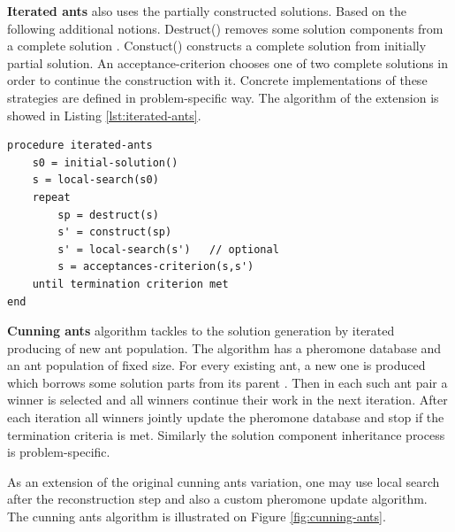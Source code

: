 \documentclass[12pt,a4paper,oneside]{book}
\begin{document}
\textbf{Iterated ants} also uses the partially constructed solutions. Based on the following additional notions. Destruct() removes some solution components from a complete solution \cite{10.1007/11839088_16}. Constuct() constructs a complete solution from initially partial solution. An acceptance-criterion chooses one of two complete solutions in order to continue the construction with it. Concrete implementations of these strategies are defined in problem-specific way. The algorithm of the extension is showed in Listing \ref{lst:iterated-ants}.

\begin{minipage}[c, breaklines=true]{0.95\textwidth}
\begin{lstlisting}[caption={General iterated ants pseudo-code}, label={lst:iterated-ants}]
procedure iterated-ants
	s0 = initial-solution()
	s = local-search(s0)
	repeat
		sp = destruct(s)
		s' = construct(sp)
		s' = local-search(s')   // optional
		s = acceptances-criterion(s,s')
	until termination criterion met
end
\end{lstlisting}
\end{minipage}

\textbf{Cunning ants} algorithm tackles to the solution generation by iterated producing of new ant population. The algorithm has a pheromone database and an ant population of fixed size. For every existing ant, a new one is produced which borrows some solution parts from its parent \cite{Tsutsui2007}. Then in each such ant pair a winner is selected and all winners continue their work in the next iteration. After each iteration all winners jointly update the pheromone database and stop if the termination criteria is met. Similarly the solution component inheritance process is problem-specific.

As an extension of the original cunning ants variation, one may use local search after the reconstruction step and also a custom pheromone update algorithm. The cunning ants algorithm is illustrated on Figure \ref{fig:cunning-ants}.
\end{document}

